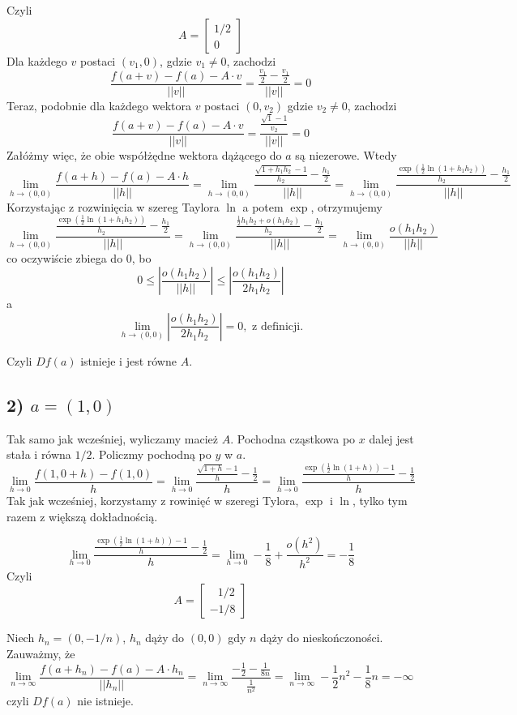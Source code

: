 \documentclass{article}
\begin{document}
Czyli
$$ A =
\begin{bmatrix}
1 /2 \\
0
\end{bmatrix}
$$
Dla każdego $v$ postaci $(v_1, 0)$, gdzie $v_1 \neq 0$, zachodzi
$$ \frac{f(a+v)-f(a)- A \cdot v}{||v||} = \frac{\frac{v_1}{2} - \frac{v_1}{2}}{||v||} = 0 $$
Teraz, podobnie dla każdego wektora $v$ postaci $(0, v_2)$ gdzie $v_2 \neq 0$, zachodzi
$$ \frac{f(a+v)-f(a)- A \cdot v}{||v||} = \frac{\frac{\sqrt{1} - 1}{v_2}}{||v||} = 0$$
Załóżmy więc, że obie współżędne wektora dążącego do $a$ są niezerowe. Wtedy
$$ \lim_{h\to (0,0)} \frac{f(a+h) - f(a)-A \cdot h}{||h||} = 
\lim_{h \to (0,0)} \frac{\frac{\sqrt{1+h_1h_2}-1}{h_2} - \frac{h_1}{2}}{||h||} = 
\lim_{h \to (0,0)}\frac{\frac{\exp(\frac{1}{2} \ln(1+h_1h_2))}{h_2} - \frac{h_1}{2}}{||h||} $$
Korzystając z rozwinięcia w szereg Taylora $\ln$ a potem $\exp$, otrzymujemy
$$ \lim_{h \to (0,0)}\frac{\frac{\exp(\frac{1}{2} \ln(1+h_1h_2))}{h_2} - \frac{h_1}{2}}{||h||} =
\lim_{h \to (0,0)}\frac{\frac{\frac{1}{2}h_1h_2 + o(h_1h_2)}{h_2} - \frac{h_1}{2}}{||h||} = 
\lim_{h \to (0,0)} \frac{o(h_1h_2)}{||h||}$$
co oczywiście zbiega do 0, bo 
$$0 \le \left| \frac{o(h_1h_2)}{||h||} \right| \le \left| \frac{o(h_1h_2)}{2h_1h_2} \right| $$
a 
$$ \lim_{h \to (0,0)} \left| \frac{o(h_1h_2)}{2h_1h_2} \right| = 0, \mbox{ z definicji.} $$

Czyli $Df(a)$ istnieje i jest równe $A$.

\subsection*{2) $a=(1,0)$}
Tak samo jak wcześniej, wyliczamy macież $A$. \newline
Pochodna cząstkowa po $x$ dalej jest stała i równa $1/2$. Policzmy pochodną po $y$ w $a$.
$$\lim_{h \to 0} \frac{f(1,0+h)-f(1,0)}{h} = 
\lim_{h \to 0} \frac{\frac{\sqrt{1+h}-1}{h} - \frac{1}{2}}{h} 
= \lim_{h \to 0}\frac{\frac{\exp(\frac{1}{2}\ln(1+h))-1}{h} - \frac{1}{2}}{h} $$
Tak jak wcześniej, korzystamy z rowinięć w szeregi Tylora, $\exp$ i $\ln$, tylko tym razem z większą dokładnością.

$$ \lim_{h \to 0}\frac{\frac{\exp(\frac{1}{2}\ln(1+h))-1}{h} - \frac{1}{2}}{h} = 
\lim_{h \to 0} -\frac{1}{8} + \frac{o(h^2)}{h^2} = -\frac{1}{8} $$
Czyli 
$$ A =
\begin{bmatrix}
\: \; \: 1 /2 \\
-1 /8
\end{bmatrix}
$$

Niech $h_n=(0,-1 /n)$, $h_n$ dąży do $(0,0)$ gdy $n$ dąży do nieskończoności. Zauważmy, że
$$ \lim_{n \to \infty} \frac{f(a+h_n) - f(a) - A \cdot h_n}{||h_n||} = 
\lim_{n \to \infty} \frac{-\frac{1}{2} - \frac{1}{8n}}{\frac{1}{n^2}} =
\lim_{n \to \infty} -\frac{1}{2}n^2 - \frac{1}{8}n =
-\infty
$$
czyli $Df(a)$ nie istnieje.
\end{document}
